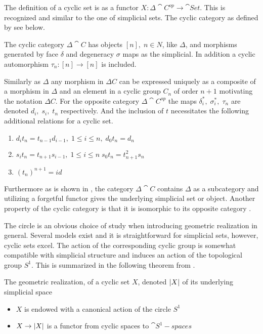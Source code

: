 \documentclass[../../main.tex]{subfiles}
\begin{document}
    The definition of a cyclic set is as a functor $X:\Delta \cat{C^{op}} \to \cat{Set}$. This is recognized and similar to the one of simplicial sets. The cyclic category as defined by \cite{loday-cyclic} see below.
    
    \begin{definition}
        The cyclic category $\Delta \cat{C}$ has objects $[n], \;n\in N$, like $\Delta$, and morphisms generated by face $\delta$ and degeneracy $\sigma$ maps as the simplicial. In addition a cyclic automorphism $\tau_n:[n]\to [n]$ is included.
    \end{definition}

    Similarly as $\Delta$ any morphism in $\Delta C$ can be expressed uniquely as a composite of a morphism in $\Delta$ and an element in a cyclic group $C_n$ of order $n+1$ motivating the notation $\Delta C$. For the opposite category $\Delta \cat{C^{op}}$ the maps $\delta_i^*, \; \sigma_i^*,\;\tau_n$ are denoted $d_i,\; s_i, \; t_n$ respectively. And the inclusion of $t$ necessitates the following additional relations for a cyclic set.
    \begin{enumerate}
        \item $d_it _n = t_{n-1}d_{i-1},\; 1 \leq i\leq n, \; d_0t_n=d_n$
        \item $s_i t _n = t_{n+1}s_{i-1},\; 1 \leq i\leq n \; s_0t_n=t_{n+1}^2s_n$
        \item $(t_{n})^{n+1}=id$
    \end{enumerate}
    Furthermore as is shown in \cite{loday-cyclic}, the category $\Delta \cat{C}$ contains $\Delta$ as a subcategory and utilizing a forgetful functor gives the underlying simplicial set or object. Another property of the cyclic category is that it is isomorphic to its opposite category \cite{loday-cyclic}.

    The circle is an obvious choice of study when introducing geometric realization in general. Several models exist and it is straightforward for simplicial sets, however, cyclic sets excel. The action of the corresponding cyclic group is somewhat compatible with simplicial structure and induces an action of the topological group $S^1$. This is summarized in the following theorem from \cite{loday-cyclic}.

    \begin{theorem}\label{hardstuff}
        The geometric realization, of a cyclic set $X$, denoted $\geom[X]$ of its underlying simplicial space
        \begin{itemize}
            \item $X$ is endowed with a canonical action of the circle $S^1$
            \item $X \to \geom[X]$ is a functor from cyclic spaces to $\cat{S^1-spaces}$
        \end{itemize}
    \end{theorem} %
\end{document}
